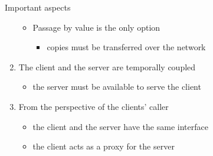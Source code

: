 \documentclass{beamer}\mode<presentation>{\usetheme{AMSBolognaFC}}
\begin{document}
\begin{frame}[allowframebreaks]
\begin{alertblock}{Important aspects}
\begin{enumerate}
\begin{itemize}
                \item Passage by value is the only option
                \begin{itemize}
                    \item copies must be transferred over the network
                \end{itemize}
            \end{itemize}

            \item The client and the server are temporally coupled
            \begin{itemize}
                \item the server must be available to serve the client
            \end{itemize}

            \item From the perspective of the clients' caller
            \begin{itemize}
                \item the client and the server have the same interface
                \item the client acts as a proxy for the server
            \end{itemize}
        \end{enumerate}
    \end{alertblock}

\end{frame}
\end{document}
